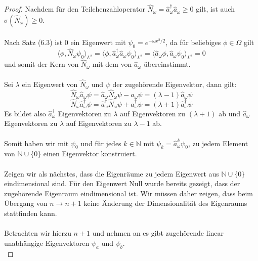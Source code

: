 \documentclass[11pt,a4paper,leqno]{report}
\numberwithin{equation}{chapter}
\begin{document}
\begin{proof}
	Nachdem f\"ur den Teilchenzahloperator $\hat{N}_\omega =\hat{a}^\dagger_\omega\hat{a}_\omega\geq 0$ gilt, ist auch $\sigma(\hat{N}_\omega)\geq 0$.\\
	\\
	Nach Satz (6.3) ist $0$ ein Eigenwert mit $\psi_0=e^{-\omega x^2 / 2}$, da f\"ur beliebiges $\phi\in \Omega$ gilt
	\begin{equation*}
		\langle \phi, \hat{N}_\omega\psi_0\rangle_{L^2}=\langle \phi, \hat{a}^\dagger_\omega\hat{a}_\omega\psi_0\rangle_{L^2}=\langle \hat{a}_\omega\phi, \hat{a}_\omega\psi_0\rangle_{L^2}=0
	\end{equation*}
und somit der Kern von $\hat{N}_\omega$ mit dem von $\hat{a}_\omega$ \"ubereinstimmt.\\
\\
Sei $\lambda$ ein Eigenwert von $\hat{N}_\omega$ und $\psi$ der zugeh\"orende Eigenvektor, dann gilt:
\begin{equation*}
	\hat{N}_\omega\hat{a}_\omega\psi=\hat{a}_\omega\hat{N}_\omega\psi-\hat{a}_\omega\psi=(\lambda -1)\hat{a}_\omega\psi
\end{equation*}
\begin{equation*}
	\hat{N}_\omega\hat{a}_\omega^\dagger\psi=\hat{a}_\omega^\dagger\hat{N}_\omega\psi+\hat{a}_\omega^\dagger\psi=(\lambda +1)\hat{a}_\omega^\dagger\psi
\end{equation*}
Es bildet also $\hat{a}_\omega^\dagger$ Eigenvektoren zu $\lambda$ auf Eigenvektoren zu $(\lambda + 1)$ ab und $\hat{a}_\omega$ Eigenvektoren zu $\lambda $ auf Eigenvektoren zu $\lambda -1$ ab.\\
\\
Somit haben wir mit $\psi_0$ und f\"ur jedes $k\in\mathbb{N}$ mit $\psi_k= \hat{a}_\omega^k\psi_0$, zu jedem Element von $\mathbb{N}\cup\{0\}$ einen Eigenvektor konstruiert.\\
\\
Zeigen wir als n\"achstes, dass die Eigenr\"aume zu jedem Eigenwert aus $\mathbb{N}\cup\{0\}$ eindimensional sind.
F\"ur den Eigenwert Null wurde bereits gezeigt, dass der zugeh\"orende Eigenraum eindimensional ist. Wir m\"ussen daher zeigen, dass beim \"Ubergang von $n\rightarrow n+1$ keine \"Anderung der Dimensionalit\"at des Eigenraums stattfinden kann.\\
\\
Betrachten wir hierzu $n+1$ und nehmen an es gibt  zugeh\"orende linear unabh\"angige Eigenvektoren $\psi_a$ und $\psi_b$.\\

\end{proof}
\end{document}
